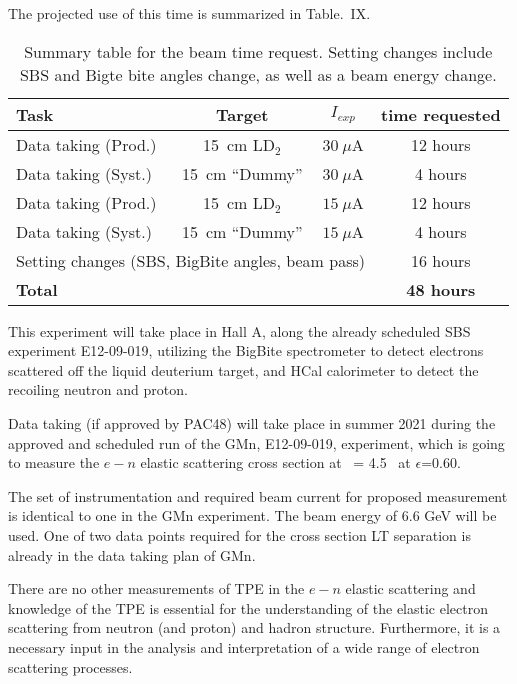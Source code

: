 The projected use of this time is summarized in Table.~IX.%
%
\begin{center}
\begin{table}[h]
\begin{tabular}{|l|c|c|c|}
\hline
Task & Target & $I_{exp}$ & time requested \\
\hline
Data taking (Prod.) & 15~cm LD$_2$ & $30~\mu$A & 12 hours \\ 
\hline
Data taking (Syst.) & 15~cm ``Dummy'' & $30~\mu$A & 4 hours \\ 
\hline
Data taking (Prod.) & 15~cm LD$_2$ & $15~\mu$A & 12 hours \\ 
\hline
Data taking (Syst.) & 15~cm ``Dummy'' & $15~\mu$A & 4 hours \\ 
\hline
\multicolumn{3}{|l|}{Setting changes (SBS, BigBite angles, beam pass)} & 16 hours \\
\hline
\hline
\multicolumn{3}{|l|}{\bf Total} & {\bf 48 hours} \\
\hline
\end{tabular} 
\caption{Summary table for the beam time request. Setting changes include SBS and Bigte bite angles change, as well as a beam energy change.}%
\label{tab:beamtime}
\end{table}
\end{center}
%
This experiment will take place in Hall A, along the already scheduled SBS \gmn experiment E12-09-019, utilizing the BigBite spectrometer to detect electrons scattered off 
the liquid deuterium target, and HCal calorimeter to detect the recoiling neutron and proton.

Data taking (if approved by PAC48) will take place in summer 2021 during the approved and scheduled run of the GMn, E12-09-019, experiment,
which is going to measure the $e-n$ elastic scattering cross section at \qsq~= 4.5 \gevcsq~at $\epsilon$=0.60.

The set of instrumentation and required beam current for proposed measurement is identical to one in the GMn experiment.
The beam energy of 6.6 GeV will be used.
One of two data points required for the cross section LT separation is already in the data taking plan of GMn.

There are no other measurements of TPE in the $e-n$ elastic scattering and knowledge of the TPE is essential for the understanding 
of the elastic electron scattering from neutron (and proton) and hadron structure.  
Furthermore, it is a necessary input in the analysis and interpretation of a wide range of electron scattering processes. 

